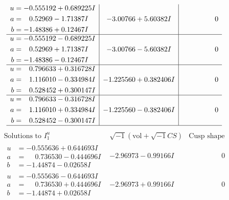 \documentclass[1p]{elsarticle_modified}
\theoremstyle{definition}
\newcommand{\I}{\sqrt{-1}}
\begin{document}
$$\begin{array}{c|c|c}
\begin{aligned}
u &= -0.555192 + 0.689225 I \\
a &= \phantom{-}0.52969 - 1.71387 I \\
b &= -1.48386 + 0.12467 I\end{aligned}
 & -3.00766 + 5.60382 I & \phantom{-0.000000 } 0 \\ \hline\begin{aligned}
u &= -0.555192 - 0.689225 I \\
a &= \phantom{-}0.52969 + 1.71387 I \\
b &= -1.48386 - 0.12467 I\end{aligned}
 & -3.00766 - 5.60382 I & \phantom{-0.000000 } 0 \\ \hline\begin{aligned}
u &= \phantom{-}0.796633 + 0.316728 I \\
a &= \phantom{-}1.116010 - 0.334984 I \\
b &= \phantom{-}0.528452 + 0.300147 I\end{aligned}
 & -1.225560 + 0.382406 I & \phantom{-0.000000 } 0 \\ \hline\begin{aligned}
u &= \phantom{-}0.796633 - 0.316728 I \\
a &= \phantom{-}1.116010 + 0.334984 I \\
b &= \phantom{-}0.528452 - 0.300147 I\end{aligned}
 & -1.225560 - 0.382406 I & \phantom{-0.000000 } 0\\
 \hline 
 \end{array}$$\newpage$$\begin{array}{c|c|c}  
\text{Solutions to }I^u_{1}& \I (\text{vol} + \sqrt{-1}CS) & \text{Cusp shape}\\
 \hline 
\begin{aligned}
u &= -0.555636 + 0.644693 I \\
a &= \phantom{-}0.736530 - 0.444696 I \\
b &= -1.44874 - 0.02658 I\end{aligned}
 & -2.96973 - 0.99166 I & \phantom{-0.000000 } 0 \\ \hline\begin{aligned}
u &= -0.555636 - 0.644693 I \\
a &= \phantom{-}0.736530 + 0.444696 I \\
b &= -1.44874 + 0.02658 I\end{aligned}
 & -2.96973 + 0.99166 I & \phantom{-0.000000 } 0 \\ \hline\begin{aligned}

\end{aligned}
\end{array}$$
\end{document}
